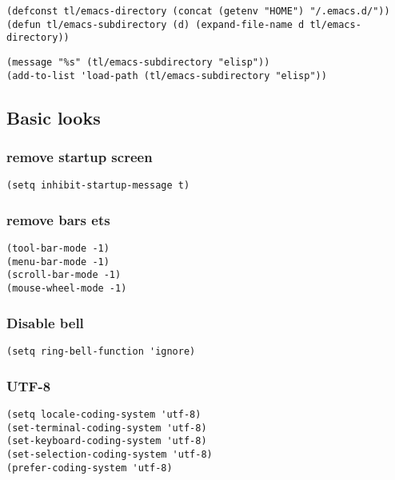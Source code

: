 \documentclass[12pt]{article}
\begin{document}
\begin{verbatim}
(defconst tl/emacs-directory (concat (getenv "HOME") "/.emacs.d/"))
(defun tl/emacs-subdirectory (d) (expand-file-name d tl/emacs-directory))
\end{verbatim}

\begin{verbatim}
(message "%s" (tl/emacs-subdirectory "elisp"))
(add-to-list 'load-path (tl/emacs-subdirectory "elisp"))
\end{verbatim}

\subsection{Basic looks}
\label{sec:org11ebfb7}
\subsubsection{remove startup screen}
\label{sec:org685f4f5}
\begin{verbatim}
(setq inhibit-startup-message t)
\end{verbatim}

\subsubsection{remove bars ets}
\label{sec:orgc4e1640}
\begin{verbatim}
(tool-bar-mode -1)
(menu-bar-mode -1)
(scroll-bar-mode -1)
(mouse-wheel-mode -1)
\end{verbatim}

\subsubsection{Disable bell}
\label{sec:orgbf0c699}
\begin{verbatim}
(setq ring-bell-function 'ignore)
\end{verbatim}

\subsubsection{UTF-8}
\label{sec:org83ef712}

\begin{verbatim}
(setq locale-coding-system 'utf-8)
(set-terminal-coding-system 'utf-8)
(set-keyboard-coding-system 'utf-8)
(set-selection-coding-system 'utf-8)
(prefer-coding-system 'utf-8)
\end{verbatim}
\end{document}

